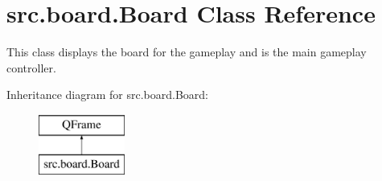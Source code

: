 \hypertarget{classsrc_1_1board_1_1_board}{}\section{src.\+board.\+Board Class Reference}
\label{classsrc_1_1board_1_1_board}


This class displays the board for the gameplay and is the main gameplay controller.  


Inheritance diagram for src.\+board.\+Board\+:\begin{figure}[H]
\begin{center}
\leavevmode
\includegraphics[height=2.000000cm]{classsrc_1_1board_1_1_board}
\end{center}
\end{figure}
